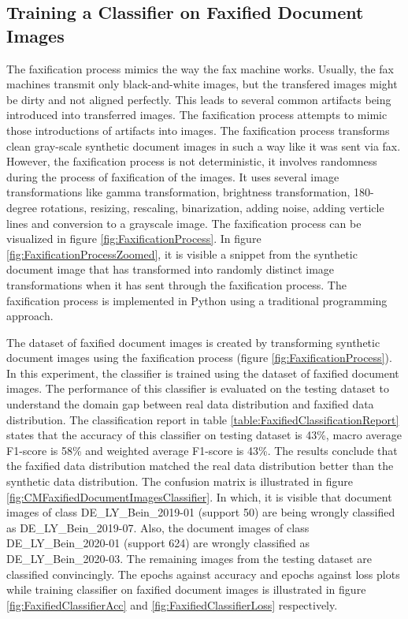 \subsection{Training a Classifier on Faxified Document Images}\label{trainingfaxifiedclassifier}


The faxification process mimics the way the fax machine works. Usually, the fax machines transmit only black-and-white images, but the transfered images might be dirty and not aligned perfectly. This leads to several common artifacts being introduced into transferred images. The faxification process attempts to mimic those introductions of artifacts into images. The faxification process transforms clean gray-scale synthetic document images in such a way like it was sent via fax. However, the faxification process is not deterministic, it involves randomness during the process of faxification of the images. It uses several image transformations like gamma transformation, brightness transformation, 180-degree rotations, resizing, rescaling, binarization, adding noise, adding verticle lines and conversion to a grayscale image. The faxification process can be visualized in figure \ref{fig:FaxificationProcess}. In figure \ref{fig:FaxificationProcessZoomed}, it is visible a snippet from the synthetic document image that has transformed into randomly distinct image transformations when it has sent through the faxification process. The faxification process is implemented in Python using a traditional programming approach.

The dataset of faxified document images is created by transforming synthetic document images using the faxification process (figure \ref{fig:FaxificationProcess}). In this experiment, the classifier is trained using the dataset of faxified document images. The performance of this classifier is evaluated on the testing dataset to understand the domain gap between real data distribution and faxified data distribution. The classification report in table \ref{table:FaxifiedClassificationReport} states that the accuracy of this classifier on testing dataset is 43\%, macro average F1-score is  58\% and weighted average F1-score is 43\%. The results conclude that the faxified data distribution matched the real data distribution better than the synthetic data distribution. The confusion matrix is illustrated in figure \ref{fig:CMFaxifiedDocumentImagesClassifier}. In which, it is visible that document images of class DE\_LY\_Bein\_2019-01 (support 50) are being wrongly classified as DE\_LY\_Bein\_2019-07. Also, the document images of class DE\_LY\_Bein\_2020-01 (support 624) are wrongly classified as DE\_LY\_Bein\_2020-03. The remaining images from the testing dataset are classified convincingly. The epochs against accuracy and epochs against loss plots while training classifier on faxified document images is illustrated in figure \ref{fig:FaxifiedClassifierAcc} and \ref{fig:FaxifiedClassifierLoss} respectively.


